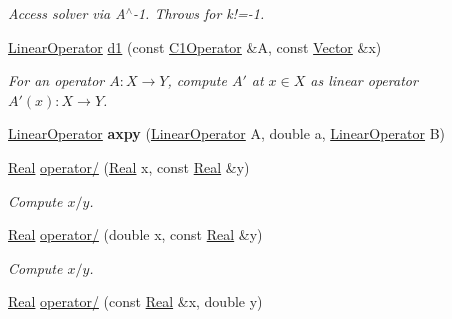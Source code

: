 \begin{DoxyCompactItemize}
\begin{DoxyCompactList}\small\item\em Access solver via A$^\wedge$-\/1. Throws for k!=-\/1. \end{DoxyCompactList}\item 
\hyperlink{group__SpacyGroup_ga584f7b9d82a844302ba0d77c3a1b6640_ga584f7b9d82a844302ba0d77c3a1b6640}{Linear\+Operator} \hyperlink{group__SpacyGroup_ga2205e2a2c4bb5242665bbc09929d35d2_ga2205e2a2c4bb5242665bbc09929d35d2}{d1} (const \hyperlink{group__SpacyGroup_ga87ae8cb0d7a567a4bb181e0a9f182620_ga87ae8cb0d7a567a4bb181e0a9f182620}{C1\+Operator} \&A, const \hyperlink{classSpacy_1_1Vector}{Vector} \&x)
\begin{DoxyCompactList}\small\item\em For an operator $ A: X\to Y $, compute $A'$ at $x\in X$ as linear operator $ A'(x): X \to Y $. \end{DoxyCompactList}\item 
\hypertarget{namespaceSpacy_a1475b1a3b4579a27909467329ffb76fc}{}\hyperlink{group__SpacyGroup_ga584f7b9d82a844302ba0d77c3a1b6640_ga584f7b9d82a844302ba0d77c3a1b6640}{Linear\+Operator} {\bfseries axpy} (\hyperlink{group__SpacyGroup_ga584f7b9d82a844302ba0d77c3a1b6640_ga584f7b9d82a844302ba0d77c3a1b6640}{Linear\+Operator} A, double a, \hyperlink{group__SpacyGroup_ga584f7b9d82a844302ba0d77c3a1b6640_ga584f7b9d82a844302ba0d77c3a1b6640}{Linear\+Operator} B)\label{namespaceSpacy_a1475b1a3b4579a27909467329ffb76fc}

\item 
\hypertarget{namespaceSpacy_af49415264c387ee164987699a32a57ba}{}\hyperlink{classSpacy_1_1Real}{Real} \hyperlink{namespaceSpacy_af49415264c387ee164987699a32a57ba}{operator/} (\hyperlink{classSpacy_1_1Real}{Real} x, const \hyperlink{classSpacy_1_1Real}{Real} \&y)\label{namespaceSpacy_af49415264c387ee164987699a32a57ba}

\begin{DoxyCompactList}\small\item\em Compute $x/y$. \end{DoxyCompactList}\item 
\hypertarget{namespaceSpacy_a804bf3930abe4a27224033d77a956c68}{}\hyperlink{classSpacy_1_1Real}{Real} \hyperlink{namespaceSpacy_a804bf3930abe4a27224033d77a956c68}{operator/} (double x, const \hyperlink{classSpacy_1_1Real}{Real} \&y)\label{namespaceSpacy_a804bf3930abe4a27224033d77a956c68}

\begin{DoxyCompactList}\small\item\em Compute $x/y$. \end{DoxyCompactList}\item 
\hypertarget{namespaceSpacy_ad43b73d5fac1c191a8fd8a4359885d23}{}\hyperlink{classSpacy_1_1Real}{Real} \hyperlink{namespaceSpacy_ad43b73d5fac1c191a8fd8a4359885d23}{operator/} (const \hyperlink{classSpacy_1_1Real}{Real} \&x, double y)\label{namespaceSpacy_ad43b73d5fac1c191a8fd8a4359885d23}


\end{DoxyCompactItemize}

